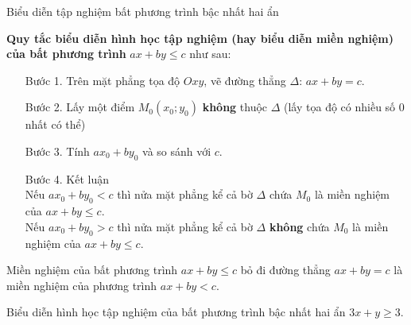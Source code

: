 \begin{dang}
{Biểu diễn tập nghiệm bất phương trình bậc nhất hai ẩn}	

\textbf{Quy tắc biểu diễn hình học tập nghiệm (hay biểu diễn miền nghiệm) của bất phương trình} $ax + by \le c$ như sau:
\begin{itemize}
	\item[Bước 1.] Trên mặt phẳng tọa độ $Oxy$, vẽ đường thẳng $\Delta$: $ax + by = c$.
	\item[Bước 2.] Lấy một điểm $M_0(x_0;y_0)$ \textbf{không} thuộc $\Delta$ (lấy tọa độ có nhiều số $0$ nhất có thể)
	\item[Bước 3.] Tính $ax_0 + by_0$ và so sánh với $c$.
	\item[Bước 4.] Kết luận\\
	Nếu $ax_0 + by_0 <c$ thì nửa mặt phẳng kể cả bờ $\Delta$ chứa $M_0$ là miền nghiệm của $ax + by \le c$.\\
	Nếu $ax_0 + by_0 >c$ thì nửa mặt phẳng kể cả bờ $\Delta$ \textbf{không} chứa $M_0$ là miền nghiệm của $ax + by \le c$.
\end{itemize}
\begin{note}
	Miền nghiệm của bất phương trình $ax + by \le c$ bỏ đi đường thẳng $ax + by =c$ là miền nghiệm của phương trình $ax + by < c$.
\end{note}
\end{dang}
\begin{vd}%
	Biểu diễn hình học tập nghiệm của bất phương trình bậc nhất hai ẩn $3x + y \ge 3$.
\end{vd}

